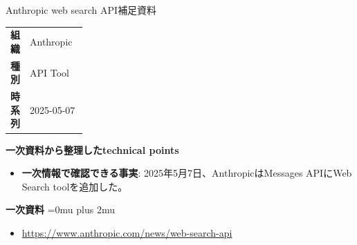 \begin{technicalnote}{Anthropic web search API}{補足資料}
\begingroup
\begin{tabularx}{\linewidth}{@{}>{\bfseries}p{0.22\linewidth}X@{}}
組織 & Anthropic \\
種別 & API Tool \\
時系列 & 2025-05-07 \\
\end{tabularx}
\smallskip
\begin{minipage}{\linewidth}
{\bfseries 一次資料から整理したtechnical points}
\begin{itemize}[leftmargin=1.5em,itemsep=0.35em]
\item \textbf{一次情報で確認できる事実}: 2025年5月7日、AnthropicはMessages APIにWeb Search toolを追加した。
\end{itemize}
\begin{samepage}
{\bfseries 一次資料}
\begingroup\sloppy
\Urlmuskip=0mu plus 2mu\relax
\begin{itemize}[leftmargin=1.5em,itemsep=0.25em]
\item {\scriptsize\url{https://www.anthropic.com/news/web-search-api}}
\end{itemize}
\endgroup
\end{samepage}
\end{minipage}
\endgroup
\end{technicalnote}
\medskip

